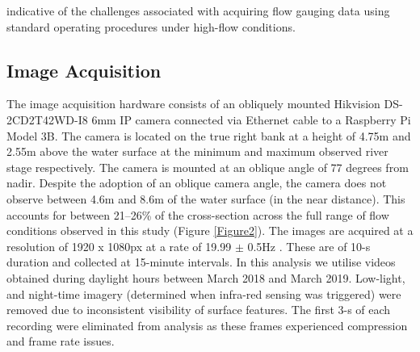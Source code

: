 \documentclass[hess, manuscript]{copernicus} %
\begin{document}
indicative of the challenges associated with acquiring flow gauging data using standard operating procedures under high-flow conditions. 

\subsection{Image Acquisition}
The image acquisition hardware consists of an obliquely mounted Hikvision DS-2CD2T42WD-I8 6mm IP camera connected via Ethernet cable to a Raspberry Pi Model 3B. The camera is located on the true right bank at a height of 4.75m and 2.55m above the water surface at the minimum and maximum observed river stage respectively. The camera is mounted at an oblique angle of 77 degrees from nadir. Despite the adoption of an oblique camera angle, the camera does not observe between 4.6m and 8.6m of the water surface (in the near distance). This accounts for between 21--26\% of the cross-section across the full range of flow conditions observed in this study (Figure \ref{Figure2}). The images are acquired at a resolution of 1920 x 1080px at a rate of 19.99 $\pm$ 0.5Hz \citep[95\% confidence interval;][]{vid_analysis}. These are of 10-s duration and collected at 15-minute intervals. In this analysis we utilise videos obtained during daylight hours between March 2018 and March 2019. Low-light, and night-time imagery (determined when infra-red sensing was triggered) were removed due to inconsistent visibility of surface features. The first 3-s of each recording were eliminated from analysis as these frames experienced compression and frame rate issues.

\begin{figure*}[]
\centering\Large
{} \\
\caption{Schematic illustrating the monitoring station setup and the camera's partial view of the river cross-section. Cross-section data is presented up to the maximum observed river level. Red dashed lines illustrate the camera's field of view. The image presented is an orthophoto produced from footage acquired on 29\textsuperscript{th} December 2018 at 13:00GMT when the flow discharge was $\approx12\textnormal{m\textsuperscript{3} s\textsuperscript{-1}}$, and section averaged flow velocity was $\approx0.54\textnormal{m s\textsuperscript{-1}}$. Vectors represent the direction and velocity of [A] only those features that pass through the cross-section of interest; and [B] all tracked features within the region of interest. Vectors coloured black are trajectories that have been filtered. In the application of theoretical flow field distributions (Figure 2A; Section 2.6.1), surface velocity data is converted to a depth-averaged before being binned into one of 20 equal-width cells enabling the cell-averaged velocity to be obtained. Blue dashes represent the spatial extent of the detected surface features and extrapolation of the flow field is required beyond this extent. The foundation of the velocity index approach (Figure 2B; Section 2.6.2), is that the average surface velocity from across the field of view can be linearly related to the 1-D velocity. }
\label{Figure2} 
\end{figure*}
\end{document}
